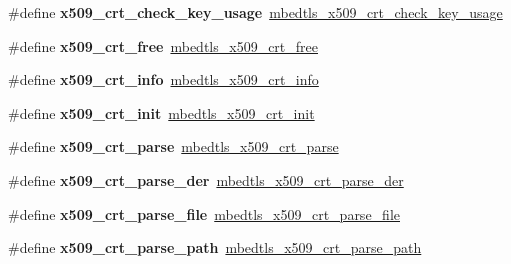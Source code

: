 \begin{DoxyCompactItemize}
\#define {\bfseries x509\+\_\+crt\+\_\+check\+\_\+key\+\_\+usage}~\mbox{\hyperlink{group__x509__module_ga0ab7857ffd82467207e718bb9f0131a2}{mbedtls\+\_\+x509\+\_\+crt\+\_\+check\+\_\+key\+\_\+usage}}
\item 
\mbox{\label{compat-1_83_8h_a105dd3b34ab4bac55f8ad24385cad121}} 
\#define {\bfseries x509\+\_\+crt\+\_\+free}~\mbox{\hyperlink{group__x509__module_gab33c1e4e20bea7ce536119f54a113c6b}{mbedtls\+\_\+x509\+\_\+crt\+\_\+free}}
\item 
\mbox{\label{compat-1_83_8h_acce086f787906b4990bd40e87e2c40e1}} 
\#define {\bfseries x509\+\_\+crt\+\_\+info}~\mbox{\hyperlink{group__x509__module_gabaf30f2269fc3b6608b25871f9d09da6}{mbedtls\+\_\+x509\+\_\+crt\+\_\+info}}
\item 
\mbox{\label{compat-1_83_8h_adfbe0232737b9aec0594c11294f29f4f}} 
\#define {\bfseries x509\+\_\+crt\+\_\+init}~\mbox{\hyperlink{group__x509__module_ga016dd06bc770e77b84005f305df20ed1}{mbedtls\+\_\+x509\+\_\+crt\+\_\+init}}
\item 
\mbox{\label{compat-1_83_8h_a58c55fb5ac1c5b28e0dff45d984875d3}} 
\#define {\bfseries x509\+\_\+crt\+\_\+parse}~\mbox{\hyperlink{group__x509__module_ga033567483649030f7f859db4f4cb7e14}{mbedtls\+\_\+x509\+\_\+crt\+\_\+parse}}
\item 
\mbox{\label{compat-1_83_8h_a5b006f1a5a47d96d99decf0d351be8c0}} 
\#define {\bfseries x509\+\_\+crt\+\_\+parse\+\_\+der}~\mbox{\hyperlink{group__x509__module_ga003c2483a2691e025641fa9d68d4a96a}{mbedtls\+\_\+x509\+\_\+crt\+\_\+parse\+\_\+der}}
\item 
\mbox{\label{compat-1_83_8h_ae51b0df56737d6c1d5493565db2331a9}} 
\#define {\bfseries x509\+\_\+crt\+\_\+parse\+\_\+file}~\mbox{\hyperlink{group__x509__module_gad4da63133d3590aa311488497d4c38ec}{mbedtls\+\_\+x509\+\_\+crt\+\_\+parse\+\_\+file}}
\item 
\mbox{\label{compat-1_83_8h_a593df382b3b659eef72c7669fab8aed1}} 
\#define {\bfseries x509\+\_\+crt\+\_\+parse\+\_\+path}~\mbox{\hyperlink{group__x509__module_ga571fc89b9f3217ab3dd67bd7af905066}{mbedtls\+\_\+x509\+\_\+crt\+\_\+parse\+\_\+path}}
\item 

\end{DoxyCompactItemize}
